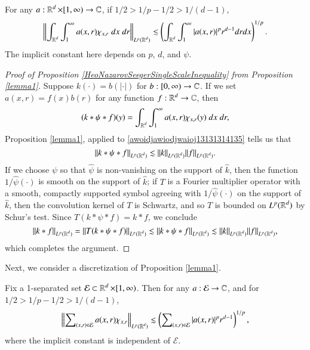 \begin{prop} \label{lemma1}
    For any $a : \operatorname{\mathbb{R}}^d \times [1,\infty) \to \operatorname{\mathbb{C}}$, if $1/2 > 1/p - 1/2 > 1/(d-1)$,
    \[ \left\| \int_{\operatorname{\mathbb{R}}^d} \int_1^\infty a(x,r) \chi_{x, r}\; dx\; dr \right\|_{L^p(\operatorname{\mathbb{R}}^d)} \lesssim \left( \int_{\operatorname{\mathbb{R}}^d} \int_1^\infty |a(x,r)|^p r^{d-1} dr dx \right)^{1/p}. \]
    The implicit constant here depends on $p$, $d$, and $\psi$.
\end{prop}

\begin{proof}[Proof of Proposition \ref{HeoNazarovSeegerSingleScaleInequality} from Proposition \ref{lemma1}] Suppose $k(\cdot) = b(|\cdot|)$ for $b: [0,\infty) \to \operatorname{\mathbb{C}}$. If we set $a(x,r) = f(x) b(r)$ for any function $f: \operatorname{\mathbb{R}}^d \to \operatorname{\mathbb{C}}$, then
%
\begin{equation} \label{awoidjawiodjwaioj13131314135}
  (k * \psi * f)(y) = \int_{\operatorname{\mathbb{R}}^d} \int_1^\infty a(x,r) \chi_{x, r}(y)\; dx\; dr,
\end{equation}
%
Proposition \ref{lemma1}, applied to \eqref{awoidjawiodjwaioj13131314135} tells us that
%
\begin{equation}
  \| k * \psi * f \|_{L^p(\operatorname{\mathbb{R}}^d)} \lesssim \| k \|_{L^p(\operatorname{\mathbb{R}}^d)} \| f \|_{L^p(\operatorname{\mathbb{R}}^d)}.
\end{equation}
%
If we choose $\psi$ so that $\widehat{\psi}$ is non-vanishing on the support of $\widehat{k}$, then the function $1/\widehat{\psi}(\cdot)$ is smooth on the support of $\widehat{k}$; if $T$ is a Fourier multiplier operator with a smooth, compactly supported symbol agreeing with $1/\widehat{\psi}(\cdot)$ on the support of $\widehat{k}$, then the convolution kernel of $T$ is Schwartz, and so $T$ is bounded on $L^p(\operatorname{\mathbb{R}}^d)$ by Schur's test. Since $T(k * \psi * f) = k * f$, we conclude
%
\begin{equation}
  \| k * f \|_{L^p(\operatorname{\mathbb{R}}^d)} = \| T(k * \psi * f) \|_{L^p(\operatorname{\mathbb{R}}^d)} \lesssim \| k * \psi * f \|_{L^p(\operatorname{\mathbb{R}}^d)} \lesssim \| k \|_{L^p(\operatorname{\mathbb{R}}^d)} \| f \|_{L^p(\operatorname{\mathbb{R}}^d)},
\end{equation}
%
which completes the argument.
\end{proof}

Next, we consider a discretization of Proposition \ref{lemma1}.

\begin{prop} \label{lemma2}
    Fix a 1-separated set $\mathcal{E} \subset \operatorname{\mathbb{R}}^d \times [1,\infty)$. Then for any $a: \mathcal{E} \to \operatorname{\mathbb{C}}$, and for $1/2 > 1/p - 1/2 > 1/(d-1)$,
    \[ \left\| \sum\nolimits_{(x,r) \in \mathcal{E}} a(x,r) \chi_{x, r} \right\|_{L^p(\operatorname{\mathbb{R}}^d)} \lesssim \left( \sum\nolimits_{(x,r) \in \mathcal{E}} |a(x,r)|^p r^{d-1} \right)^{1/p}, \]
    where the implicit constant is independent of $\mathcal{E}$.
\end{prop}

